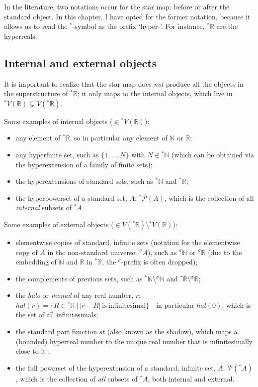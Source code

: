 In the literature, two notations occur for the star map: before or after the standard object. In this chapter, I have opted for the former notation, because it allows us to read the $^\ast$-symbol as the prefix `hyper-'. For instance, ${^\ast \mathbb{R}}$ are the hyperreals.


\subsection{Internal and external objects}\label{sec:intext}

It is important to realize that the star-map does \emph{not} produce all the objects in the superstructure of ${^\ast \mathbb{R}}$; it only maps to the internal objects, which live in  ${^\ast V}(\mathbb{R}) \subsetneq V({^\ast \mathbb{R}})$.

Some examples of internal objects ($\in {^\ast V}(\mathbb{R})$):
\begin{itemize}
  \item any element of ${^\ast \mathbb{R}}$, so in particular any element of $\mathbb{N}$ or $\mathbb{R}$;
  \item any hyperfinite set, such as $\{ 1, \ldots, N \}$ with $N \in {^\ast \mathbb{N}}$ (which can be obtained via the hyperextension of a family of finite sets);
  \item the hyperextensions of standard sets, such as ${^\ast \mathbb{N}}$ and ${^\ast \mathbb{R}}$;
  \item the hyperpowerset of a standard set, $A$: ${^\ast \mathcal{P}}(A)$, which is the collection of all \emph{internal} subsets of ${^\ast A}$.
\end{itemize}

\noindent Some examples of external objects ($\in V({^\ast \mathbb{R}}) \setminus {^\ast V}(\mathbb{R})$):
\begin{itemize}
  \item elementwise copies of standard, infinite sets (notation for the elementwise copy of $A$ in the non-standard universe: ${^\sigma A}$), such as ${^\sigma \mathbb{N}}$ or ${^\sigma \mathbb{R}}$ (due to the embedding of $\mathbb{N}$ and $\mathbb{R}$ in ${^\ast \mathbb{R}}$, the $^\sigma$-prefix is often dropped);
  \item the complements of previous sets, such as ${^\ast \mathbb{N}} \setminus {^\sigma \mathbb{N}}$ and ${^\ast \mathbb{R}} \setminus {^\sigma \mathbb{R}}$;
  \item the \textit{halo} or \textit{monad} of any real number, $r$: $hal(r) = \{ R \in {^\ast \mathbb{R}}\ |\ |r - R| \mathrm{\ is\ infinitesimal} \}$---in particular $hal(0)$, which is the set of all infinitesimals;
  \item the standard part function $st$ (also known as the shadow), which maps a (bounded) hyperreal number to the unique real number that is infinitesimally close to it \citep[section~5.6]{Goldblatt:1998};
  \item the full powerset of the hyperextension of a standard, infinite set, $A$: $\mathcal{P}({^\ast A})$, which is the collection of \emph{all} subsets of ${^\ast A}$, both internal and external.
\end{itemize}

